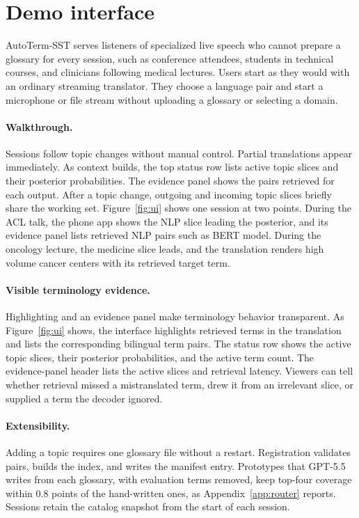 \section{Demo interface}
\label{sec:demo-interface}

AutoTerm-SST serves listeners of specialized live speech who cannot prepare a
glossary for every session, such as conference attendees, students in
technical courses, and clinicians following medical lectures. Users start
as they would with an ordinary streaming translator. They choose a language
pair and start a microphone or file stream without uploading a glossary or
selecting a domain.

\paragraph{Walkthrough.}
Sessions follow topic changes without manual control. Partial translations
appear immediately. As context builds, the top status row lists active topic
slices and their posterior probabilities. The evidence panel shows the pairs
retrieved for each output. After a topic change, outgoing and incoming topic slices
briefly share the working set. Figure~\ref{fig:ui} shows one session at two
points. During the ACL talk, the phone app shows the NLP slice leading the
posterior, and its evidence panel lists retrieved NLP pairs such as BERT model.
During the oncology lecture, the medicine slice leads, and the translation
renders high volume cancer centers with its retrieved target term.

\paragraph{Visible terminology evidence.}
Highlighting and an evidence panel make terminology behavior transparent. As
Figure~\ref{fig:ui} shows, the interface highlights retrieved terms in the
translation and lists the corresponding bilingual term pairs. The status row
shows the active topic slices, their posterior probabilities, and the active term count. The
evidence-panel header lists the active slices and retrieval latency. Viewers can tell
whether retrieval missed a mistranslated term, drew it from an irrelevant slice, or
supplied a term the decoder ignored.

\paragraph{Extensibility.}
Adding a topic requires one glossary file without a restart. Registration
validates pairs, builds the index, and writes the manifest entry. Prototypes
that GPT-5.5 writes from each glossary, with evaluation terms removed, keep
top-four coverage within 0.8 points of the hand-written ones, as
Appendix~\ref{app:router} reports.
Sessions retain the catalog snapshot from the start of each session.

